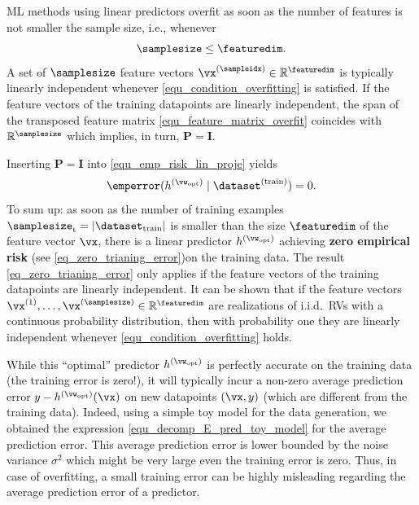 \documentclass[12pt]{report}
\begin{document}
ML methods using linear predictors overfit as soon as the 
number of features is not smaller the sample size, i.e., whenever 
\begin{equation} 
\label{equ_condition_overfitting}
\samplesize \leq \featuredim. 
\end{equation} 
A set of $\samplesize$ feature vectors $\vx^{(\sampleidx)} \in \mathbb{R}^{\featuredim}$ 
is typically linearly independent whenever \eqref{equ_condition_overfitting} is satisfied. 
If the feature vectors of the training datapoints are linearly independent, 
the span of the transposed feature matrix \eqref{equ_feature_matrix_overfit} 
coincides with $\mathbb{R}^{\samplesize}$ which implies, in turn, $\mathbf{P} = \mathbf{I}$. 

Inserting $\mathbf{P} = \mathbf{I}$ into \eqref{equ_emp_risk_lin_proje} yields 
\begin{equation}
\label{eq_zero_trianing_error}
\emperror(h^{(\vw_{\rm opt})} \mid \dataset^{(\rm train)}) = 0.
\end{equation} 
To sum up: as soon as the number of training examples $\samplesize_{\rm t} = | \dataset_{\rm train}|$ is smaller 
than the size $\featuredim$ of the feature vector $\vx$, there 
is a linear predictor $h^{(\vw_{\rm opt})}$ achieving {\bf zero empirical risk} 
(see \eqref{eq_zero_trianing_error})on the training data. The result 
\eqref{eq_zero_trianing_error} only applies if the feature vectors of 
the training datapoints are linearly independent. It can be shown 
that if the feature vectors $\vx^{(1)},\ldots,\vx^{(\samplesize)} \in \mathbb{R}^{\featuredim}$ 
are realizations of i.i.d.\ RVs with a continuous probability distribution, 
then with probability one they are linearly independent whenever \eqref{equ_condition_overfitting} holds. 

While this ``optimal'' predictor $h^{(\vw_{\rm opt})}$ is perfectly accurate on the training 
data (the training error is zero!), it will typically incur a non-zero average prediction error 
$y - h^{(\vw_{\rm opt})}(\vx)$ on new datapoints $(\vx,y)$ (which are different from the 
training data). Indeed, using a simple toy model for the data generation, we obtained the 
expression \eqref{equ_decomp_E_pred_toy_model} for the average prediction error. This 
average prediction error is lower bounded by the noise variance $\sigma^{2}$ which might 
be very large even the training error is zero. Thus, in case of overfitting, a small training 
error can be highly misleading regarding the average prediction error of a predictor. 
\end{document}
